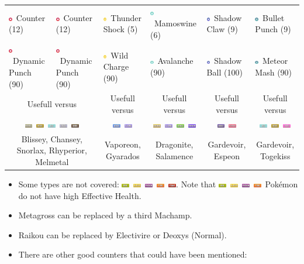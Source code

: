 \documentclass[8pt,aspectratio=169,compress]{beamer}
\newcommand{\fightingfull}{\includegraphics[height=0.15cm]{../../images/type/full/Fighting.png}}
\newcommand{\bugfull}{\includegraphics[height=0.15cm]{../../images/type/full/Bug.png}}
\newcommand{\darkfull}{\includegraphics[height=0.15cm]{../../images/type/full/Dark.png}}
\newcommand{\electricfull}{\includegraphics[height=0.15cm]{../../images/type/full/Electric.png}}
\newcommand{\fairyfull}{\includegraphics[height=0.15cm]{../../images/type/full/Fairy.png}}
\newcommand{\firefull}{\includegraphics[height=0.15cm]{../../images/type/full/Fire.png}}
\newcommand{\flyingfull}{\includegraphics[height=0.15cm]{../../images/type/full/Flying.png}}
\newcommand{\ghostfull}{\includegraphics[height=0.15cm]{../../images/type/full/Ghost.png}}
\newcommand{\dragonfull}{\includegraphics[height=0.15cm]{../../images/type/full/Dragon.png}}
\newcommand{\grassfull}{\includegraphics[height=0.15cm]{../../images/type/full/Grass.png}}
\newcommand{\groundfull}{\includegraphics[height=0.15cm]{../../images/type/full/Ground.png}}
\newcommand{\icefull}{\includegraphics[height=0.15cm]{../../images/type/full/Ice.png}}
\newcommand{\normalfull}{\includegraphics[height=0.15cm]{../../images/type/full/Normal.png}}
\newcommand{\psychicfull}{\includegraphics[height=0.15cm]{../../images/type/full/Psychic.png}}
\newcommand{\rockfull}{\includegraphics[height=0.15cm]{../../images/type/full/Rock.png}}
\newcommand{\waterfull}{\includegraphics[height=0.15cm]{../../images/type/full/Water.png}}
\newcommand{\poisonfull}{\includegraphics[height=0.15cm]{../../images/type/full/Poison.png}}
\newcommand{\steelfull}{\includegraphics[height=0.15cm]{../../images/type/full/Steel.png}}
\newcommand{\fightingsimp}{\includegraphics[height=0.15cm]{../../images/type/simplified/fighting.png}}
\newcommand{\ghostsimp}{\includegraphics[height=0.15cm]{../../images/type/simplified/ghost.png}}
\newcommand{\icesimp}{\includegraphics[height=0.15cm]{../../images/type/simplified/ice.png}}
\newcommand{\electricsimp}{\includegraphics[height=0.15cm]{../../images/type/simplified/electric.png}}
\newcommand{\steelsimp}{\includegraphics[height=0.15cm]{../../images/type/simplified/steel.png}}
\begin{document}
\begin{frame}
\begin{block}{}
\begin{tiny}
\begin{tabular}{p{1.9cm}p{1.9cm}p{1.9cm}p{1.9cm}p{1.9cm}p{1.9cm}}
\fightingsimp~Counter (12)  & \fightingsimp~Counter (12) & \electricsimp~Thunder Shock (5)  & \icesimp~Mamoswine (6) &\ghostsimp~Shadow Claw (9)&\steelsimp~Bullet Punch (9) \\
 \fightingsimp~Dynamic Punch (90)    &\fightingsimp~Dynamic Punch (90) &\electricsimp~Wild Charge (90) & \icesimp~Avalanche (90) &\ghostsimp~Shadow Ball (100) & \steelsimp~Meteor Mash (90) \\  \hline
 \multicolumn{2}{c}{Usefull versus} &  \multicolumn{1}{c}{Usefull versus} &  \multicolumn{1}{c}{Usefull versus} &  \multicolumn{1}{c}{Usefull versus} &  \multicolumn{1}{c}{Usefull versus} \\
\multicolumn{2}{c}{\normalfull~\rockfull~\icefull~\steelfull~\darkfull} & \multicolumn{1}{c}{\waterfull~\flyingfull} & \multicolumn{1}{c}{\groundfull~\flyingfull~\grassfull~\dragonfull} & \multicolumn{1}{c}{\ghostfull~\psychicfull} & \multicolumn{1}{c}{\icefull~\rockfull~\fairyfull} \\
\multicolumn{2}{c}{Blissey, Chansey, Snorlax, Rhyperior, Melmetal} & \multicolumn{1}{c}{Vaporeon, Gyarados} & \multicolumn{1}{c}{Dragonite, Salamence} & \multicolumn{1}{c}{Gardevoir, Espeon} & \multicolumn{1}{c}{Gardevoir, Togekiss} \\
\end{tabular}

\begin{itemize}
\item Some types are not covered: \bugfull~\electricfull~\poisonfull~\firefull~\fightingfull. Note that \bugfull~\electricfull~\poisonfull~\firefull~Pok\'emon do not have high Effective Health.
\item Metagross can be replaced by a third Machamp.
\item Raikou can be replaced by Electivire or Deoxys (Normal).
\item There are other good counters that could have been mentioned:


\end{itemize}
\end{tiny}
\end{block}
\end{frame}
\end{document}
